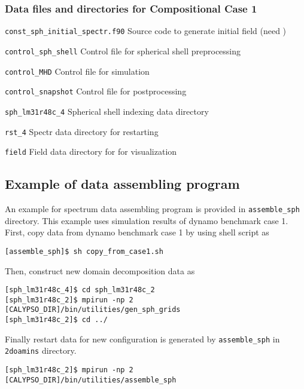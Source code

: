 \subsubsection{Data files and directories for Compositional Case 1}
\label{section:bench_case1C}
%
\begin{description}
\item{\tt const\_sph\_initial\_spectr.f90}	Source code to generate initial field (need )
\item{\tt control\_sph\_shell}	Control file for spherical shell preprocessing
\item{\tt control\_MHD}		Control file for simulation
\item{\tt control\_snapshot}	Control file for postprocessing
\item{\tt sph\_lm31r48c\_4} 	Spherical shell indexing data directory
\item{\tt rst\_4}				Spectr data directory for restarting
\item{\tt field}				Field data directory for for visualization
\end{description}
%

\subsection{Example of data assembling program}
An example for spectrum data assembling program is provided in \verb|assemble_sph| directory. This example uses simulation results of dynamo benchmark case 1.
First, copy data from dynamo benchmark case 1 by using shell script as
%
\begin{verbatim}
[assemble_sph]$ sh copy_from_case1.sh
\end{verbatim}

Then, construct new domain decomposition data as 
%
\begin{verbatim}
[sph_lm31r48c_4]$ cd sph_lm31r48c_2
[sph_lm31r48c_2]$ mpirun -np 2 [CALYPSO_DIR]/bin/utilities/gen_sph_grids
[sph_lm31r48c_2]$ cd ../
\end{verbatim}

Finally restart data for new configuration is generated by \verb|assemble_sph| in \verb|2doamins| directory.
\begin{verbatim}
[sph_lm31r48c_2]$ mpirun -np 2 [CALYPSO_DIR]/bin/utilities/assemble_sph
\end{verbatim}


